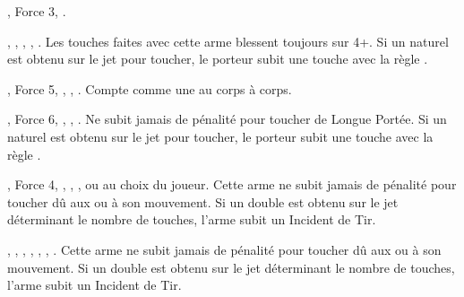 \newpage
\renewcommand{\startarmyarmoury}{\largefontsize}
\startarmyarmoury

\begin{multicols}{2}\raggedcolumns

\subtitle{Armes de Tir}

\startpricelist

\nopricelistitem{\sling} , Force 3, \quicktofire{}.

\nopricelistitem{\gasglobes} , \magicalattacks{}, , \volleyfire{}, \quicktofire{}.\vspace{2pt}\newline
Les touches faites avec cette arme blessent toujours sur 4+. Si un  naturel est obtenu sur le jet pour toucher, le porteur subit une touche avec la règle \toxicattacks{}.

\nopricelistitem{\ratlockpistol} , Force 5, \magicalattacks{}, , \quicktofire{}. \vspace{2pt}\newline
Compte comme une \pw{} au corps à corps.

\nopricelistitem{\jezail} , Force 6, \magicalattacks{}, \unwieldy{}, .\vspace{2pt}\newline
Ne subit jamais de pénalité pour toucher de Longue Portée. Si un  naturel est obtenu sur le jet pour toucher, le porteur subit une touche avec la règle \toxicattacks{}.

\nopricelistitem{\rotarygun} , Force 4, \magicalattacks{}, \volatile{}, \reload{},  ou  au choix du joueur.\vspace{2pt}\newline
Cette arme ne subit jamais de pénalité pour toucher dû aux \multipleshots{} ou à son mouvement. Si un double est obtenu sur le jet déterminant le nombre de touches, l'arme subit un Incident de Tir.

\nopricelistitem{\globelauncher} , \magicalattacks{}, \toxicattacks{}, \volatile{}, \reload{}, \volleyfire{}, .\vspace{2pt}\newline
Cette arme ne subit jamais de pénalité pour toucher dû aux \multipleshots{} ou à son mouvement. Si un double est obtenu sur le jet déterminant le nombre de touches, l'arme subit un Incident de Tir.


\end{multicols}
